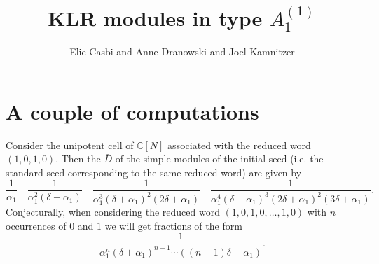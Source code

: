 \documentclass[11pt]{article}
\begin{document}
\theoremstyle{plain}
\newtheorem{deftn}{Definition}[section]
\newtheorem{lem}[deftn]{Lemma}
\newtheorem{prop}[deftn]{Proposition}
\newtheorem{thm}[deftn]{Theorem}
\newtheorem{cor}[deftn]{Corollary}
\newtheorem{conj}[deftn]{Conjecture}
\newtheorem{Question}[deftn]{Question}
\newtheorem{Fact}{Evidence}
\newtheorem{assump}{Assumption}[section]
\renewcommand{\theassump}{\Alph{assump}}
\newtheorem{conjintro}{Conjecture}
\newtheorem{thmintro}{Theorem}

\theoremstyle{definition}
\newtheorem{ex}[deftn]{Example}
\newtheorem{rk}[deftn]{Remark}


\newcommand{\CQ}{\mathcal{C}_Q}
\newcommand{\CZ}{\mathcal{C}_{\mathbb{Z}}}
\newcommand{\Atn}{\mathcal{A}_t (\mathfrak{n})}
\newcommand{\CN}{\mathbb{C}[N]}


\title{KLR modules in type $A_1^{(1)}$}
  \author{Elie Casbi and Anne Dranowski and Joel Kamnitzer}
 
     \date{}

\maketitle

\section{A couple of computations}

Consider the unipotent cell of $\CN$ associated with the reduced word $(1,0,1,0)$. Then the $\bar{D}$ of the simple modules of the  initial seed (i.e. the standard seed corresponding to the same reduced word) are given by 
$$ \frac{1}{\alpha_1} \quad  \frac{1}{\alpha_1^2(\delta + \alpha_1)} \quad  \frac{1}{\alpha_1^3(\delta + \alpha_1)^2(2 \delta + \alpha_1)} \quad \frac{1}{\alpha_1^4(\delta + \alpha_1)^3(2 \delta + \alpha_1)^2(3 \delta + \alpha_1)} . $$ 
Conjecturally, when considering the reduced word $(1,0,1,0, \ldots , 1,0)$ with $n$ occurrences of $0$ and $1$ we will get fractions of the form 
$$  \frac{1}{\alpha_1^n(\delta + \alpha_1)^{n-1} \cdots ((n-1) \delta + \alpha_1)} . $$ 

 
\end{document}
